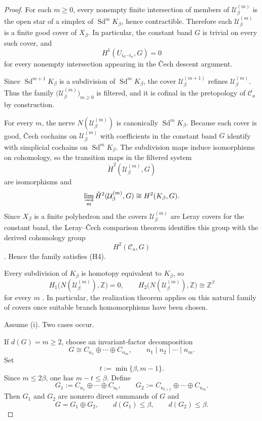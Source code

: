 \begin{proof}
For each $m\ge 0$, every nonempty finite intersection of members of $\mathcal U_\beta^{(m)}$ is the open star of a simplex of $\operatorname{Sd}^m K_\beta$, hence contractible. Therefore each $\mathcal U_\beta^{(m)}$ is a finite good cover of $X_\beta$. In particular, the constant band $G$ is trivial on every such cover, and
\[
H^1(U_{i_0\cdots i_n},G)=0
\]
for every nonempty intersection appearing in the \v{C}ech descent argument.

Since $\operatorname{Sd}^{m+1}K_\beta$ is a subdivision of $\operatorname{Sd}^{m}K_\beta$, the cover $\mathcal U_\beta^{(m+1)}$ refines $\mathcal U_\beta^{(m)}$. Thus the family $\bigl(\mathcal U_\beta^{(m)}\bigr)_{m\ge 0}$ is filtered, and it is cofinal in the pretopology of $\mathcal C_a$ by construction.

For every $m$, the nerve $N(\mathcal U_\beta^{(m)})$ is canonically $\operatorname{Sd}^{m}K_\beta$. Because each cover is good, \v{C}ech cochains on $\mathcal U_\beta^{(m)}$ with coefficients in the constant band $G$ identify with simplicial cochains on $\operatorname{Sd}^{m}K_\beta$. The subdivision maps induce isomorphisms on cohomology, so the transition maps in the filtered system
\[
\check H^2(\mathcal U_\beta^{(m)},G)
\]
are isomorphisms and
\[
\varinjlim_m \check H^2(\mathcal U_\beta^{(m)},G)\cong H^2(K_\beta,G).
\]
Since $X_\beta$ is a finite polyhedron and the covers $\mathcal U_\beta^{(m)}$ are Leray covers for the constant band, the Leray--\v{C}ech comparison theorem identifies this group with the derived cohomology group
\[
H^2(\mathcal C_a,G)
\]
\cite{Bredon1997}. Hence the family satisfies \textup{(H4)}.

Every subdivision of $K_\beta$ is homotopy equivalent to $K_\beta$, so
\[
H_1\bigl(N(\mathcal U_\beta^{(m)}),\mathbb Z\bigr)=0,
\qquad
H_2\bigl(N(\mathcal U_\beta^{(m)}),\mathbb Z\bigr)\cong \mathbb Z^\beta
\]
for every $m$ \cite[Secs.~2.1, 2.2]{Hatcher2002}. In particular, the realization theorem  applies on this natural family of covers once suitable branch homomorphisms have been chosen.

Assume \textup{(i)}. Two cases occur.

If $d(G)=m\ge 2$, choose an invariant-factor decomposition
\[
G\cong C_{n_1}\oplus\cdots\oplus C_{n_m},
\qquad
n_1\mid n_2\mid\cdots\mid n_m.
\]
Set
\[
t:=\min\{\beta,m-1\}.
\]
Since $m\le 2\beta$, one has $m-t\le \beta$. Define
\[
G_1:=C_{n_1}\oplus\cdots\oplus C_{n_t},
\qquad
G_2:=C_{n_{t+1}}\oplus\cdots\oplus C_{n_m}.
\]
Then $G_1$ and $G_2$ are nonzero direct summands of $G$ and
\[
G=G_1\oplus G_2,
\qquad
d(G_1)\le \beta,
\qquad
d(G_2)\le \beta.
\]


\end{proof}
